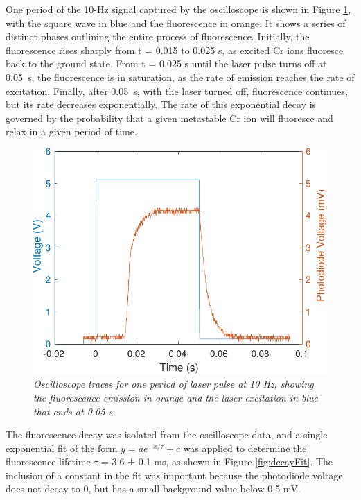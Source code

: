 \documentclass[11pt, a4paper, twocolumn]{article}
\begin{document}
One period of the 10-Hz signal captured by the oscilloscope is shown in Figure \ref{fig:fluorescencePeriod}, with the square wave in blue and the fluorescence in orange. It shows a series of distinct phases outlining the entire process of fluorescence. Initially, the fluorescence rises sharply from t = 0.015 to 0.025 s, as excited Cr ions fluoresce back to the ground state. From t = 0.025 s until the laser pulse turns off at \SI{0.05}{\s}, the fluorescence is in saturation, as the rate of emission reaches the rate of excitation. Finally, after \SI{0.05}{\s}, with the laser turned off, fluorescence continues, but its rate decreases exponentially. The rate of this exponential decay is governed by the probability that a given metastable Cr ion will fluoresce and relax in a given period of time. 

\begin{figure} %
\includegraphics[width=\linewidth]{fluorescencePeriod.pdf}
\caption{\textit{Oscilloscope traces for one period of laser pulse at 10 Hz, showing the fluorescence emission in orange and the laser excitation in blue that ends at 0.05 s.}}
\label{fig:fluorescencePeriod}
\end{figure}

The fluorescence decay was isolated from the oscilloscope data, and a single exponential fit of the form $y = ae^{-x/\tau} + c$ was applied to determine the fluorescence lifetime $\tau$ = 3.6 ± 0.1 ms, as shown in Figure \ref{fig:decayFit}. The inclusion of a constant in the fit was important because the photodiode voltage does not decay to 0, but has a small background value below 0.5 mV.
\end{document}
